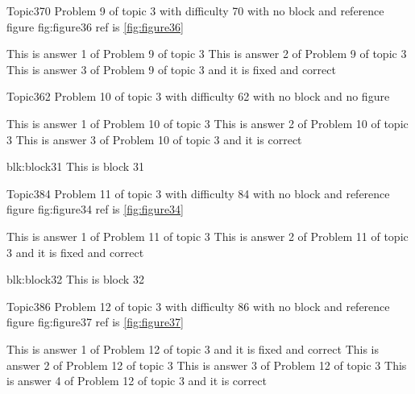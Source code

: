 \documentclass[master]{exam}
\begin{document}
\begin{problem}{Topic3}{70}
	Problem 9 of topic 3 with difficulty 70 with no block and reference figure fig:figure36 ref is \ref{fig:figure36}
	\begin{answers}
		\answer This is answer 1 of Problem 9 of topic 3 
		\answer This is answer 2 of Problem 9 of topic 3 
		 This is answer 3 of Problem 9 of topic 3 and it is fixed and correct
	\end{answers}
\end{problem}

\begin{problem}{Topic3}{62}
	Problem 10 of topic 3 with difficulty 62 with no block and no figure
	\begin{answers}
		\answer This is answer 1 of Problem 10 of topic 3 
		\answer This is answer 2 of Problem 10 of topic 3 
		\answer[correct] This is answer 3 of Problem 10 of topic 3 and it is correct
	\end{answers}
\end{problem}



\begin{block}{blk:block31}
This is block 31
\end{block}


\begin{problem}{Topic3}{84}
	Problem 11 of topic 3 with difficulty 84 with no block and reference figure fig:figure34 ref is \ref{fig:figure34}
	\begin{answers}
		\answer This is answer 1 of Problem 11 of topic 3 
		 This is answer 2 of Problem 11 of topic 3 and it is fixed and correct
	\end{answers}
\end{problem}



\begin{block}{blk:block32}
This is block 32
\end{block}


\begin{problem}{Topic3}{86}
	Problem 12 of topic 3 with difficulty 86 with no block and reference figure fig:figure37 ref is \ref{fig:figure37}
	\begin{answers}
		 This is answer 1 of Problem 12 of topic 3 and it is fixed and correct
		\answer This is answer 2 of Problem 12 of topic 3 
		\answer This is answer 3 of Problem 12 of topic 3 
		\answer[correct] This is answer 4 of Problem 12 of topic 3 and it is correct
	\end{answers}
\end{problem}
\end{document}
